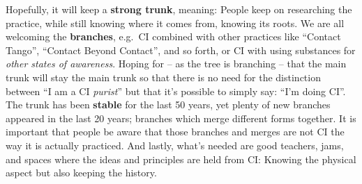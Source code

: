 Hopefully, it will keep a \textbf{strong trunk}, meaning: People keep on researching the practice, while still knowing where it comes from, knowing its roots.
We are all welcoming the \textbf{branches}, e.g.\ CI combined with other practices like ``Contact Tango'', ``Contact Beyond Contact'', and so forth, or CI with using substances for \textit{other states of awareness}.
Hoping for -- as the tree is branching -- that the main trunk will stay the main trunk so that there is no need for the distinction between ``I am a CI \textit{purist}'' but that it's possible to simply say: ``I'm doing CI''.
The trunk has been \textbf{stable} for the last 50 years, yet plenty of new branches appeared in the last 20 years; branches which merge different forms together.
It is important that people be aware that those branches and merges are not CI the way it is actually practiced.
And lastly, what's needed are good teachers, jams, and spaces where the ideas and principles are held from CI: Knowing the physical aspect but also keeping the history.
